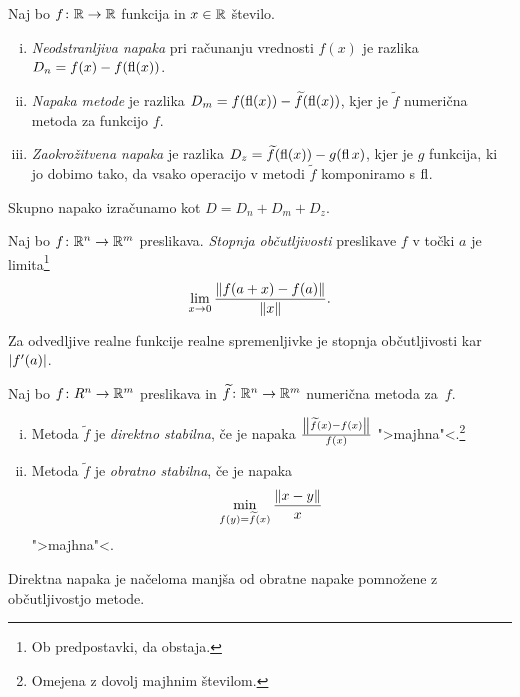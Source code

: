 \begin{definicija}
Naj bo $f \colon \mathbb{R} \to \mathbb{R}$ funkcija in $x \in \mathbb{R}$ število.

\begin{enumerate}[i)]
\item \emph{Neodstranljiva napaka} pri
računanju vrednosti $f(x)$ je razlika $D_n = f(x) - f(\operatorname{fl}(x))$.

\item \emph{Napaka metode} je razlika
$D_m = f(\operatorname{fl}(x)) - \widetilde{f}(\operatorname{fl}(x))$, kjer je $\widetilde{f}$
numerična metoda za funkcijo $f$.

\item \emph{Zaokrožitvena napaka} je razlika
$D_z = \widetilde{f}(\operatorname{fl}(x)) - g(\operatorname{fl}{x})$, kjer je $g$ funkcija, ki
jo dobimo tako, da vsako operacijo v metodi $\widetilde{f}$
komponiramo s $\operatorname{fl}$.
\end{enumerate}
Skupno napako izračunamo kot $D = D_n + D_m + D_z$.
\end{definicija}

\begin{definicija}
Naj bo $f \colon \mathbb{R}^n \to \mathbb{R}^m$ preslikava.
\emph{Stopnja občutljivosti}
preslikave $f$ v točki $a$ je limita\footnote{Ob predpostavki, da
obstaja.}
\[
\lim_{x \to 0} \frac{\left\lVert f(a+x) - f(a)\right\rVert}{\left\lVert x\right\rVert}.
\]
\end{definicija}

\begin{opomba}
Za odvedljive realne funkcije realne spremenljivke je stopnja
občutljivosti kar $\left\lvert f'(a)\right\rvert$.
\end{opomba}

\begin{definicija}
Naj bo $f \colon R^n \to \mathbb{R}^m$ preslikava in
$\widetilde{f} \colon \mathbb{R}^n \to \mathbb{R}^m$ numerična metoda za~$f$.

\begin{enumerate}[i)]
\item Metoda $\widetilde{f}$ je
\emph{direktno stabilna}, če je napaka
$\frac{\left\lVert \widetilde{f}(x) - f(x)\right\rVert}{f(x)}$
">majhna"<.\footnote{Omejena z dovolj majhnim številom.}
\item Metoda $\widetilde{f}$ je \emph{obratno stabilna}, če je
napaka
\[
\min_{f(y) = \widetilde{f}(x)} \frac{\left\lVert x-y\right\rVert}{x}
\]
">majhna"<.
\end{enumerate}
\end{definicija}

\begin{opomba}
Direktna napaka je načeloma manjša od obratne napake pomnožene z
občutljivostjo metode.
\end{opomba}

